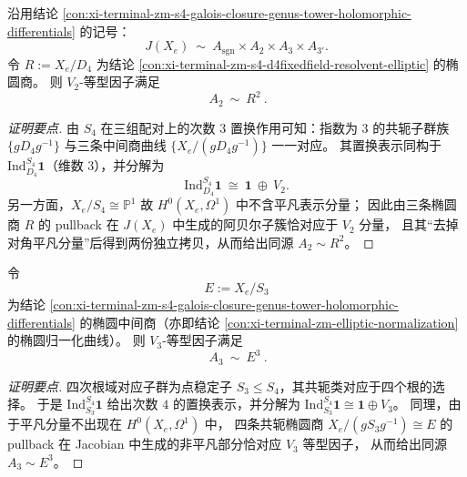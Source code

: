 \begin{conclusion}\label{con:xi-terminal-zm-s4-jacobian-a2-isog-r2}
沿用结论 \ref{con:xi-terminal-zm-s4-galois-closure-genus-tower-holomorphic-differentials} 的记号：
\[
J(X_e)\ \sim\ A_{\mathrm{sgn}}\times A_{2}\times A_{3}\times A_{3'}.
\]
令 \(R:=X_e/D_4\) 为结论 \ref{con:xi-terminal-zm-s4-d4fixedfield-resolvent-elliptic} 的椭圆商。
则 \(V_2\)-等型因子满足
\[
\boxed{\ A_{2}\ \sim\ R^{2}\ }.
\]
\end{conclusion}
\begin{proof}[证明要点]
由 \(S_4\) 在三组配对上的次数 \(3\) 置换作用可知：指数为 \(3\) 的共轭子群族 \(\{gD_4g^{-1}\}\) 与三条中间商曲线 \(\{X_e/(gD_4g^{-1})\}\) 一一对应。
其置换表示同构于 \(\mathrm{Ind}_{D_4}^{S_4}\mathbf{1}\)（维数 \(3\)），并分解为
\[
\mathrm{Ind}_{D_4}^{S_4}\mathbf{1}\ \cong\ \mathbf{1}\ \oplus\ V_2.
\]
另一方面，\(X_e/S_4\cong\mathbb P^1\) 故 \(H^0(X_e,\Omega^1)\) 中不含平凡表示分量；
因此由三条椭圆商 \(R\) 的 pullback 在 \(J(X_e)\) 中生成的阿贝尔子簇恰对应于 \(V_2\) 分量，
且其“去掉对角平凡分量”后得到两份独立拷贝，从而给出同源 \(A_2\sim R^2\)。
\end{proof}

\begin{conclusion}\label{con:xi-terminal-zm-s4-jacobian-a3-isog-e3}
令
\[
E:=X_e/S_3
\]
为结论 \ref{con:xi-terminal-zm-s4-galois-closure-genus-tower-holomorphic-differentials} 的椭圆中间商（亦即结论 \ref{con:xi-terminal-zm-elliptic-normalization} 的椭圆归一化曲线）。
则 \(V_3\)-等型因子满足
\[
\boxed{\ A_{3}\ \sim\ E^{3}\ }.
\]
\end{conclusion}
\begin{proof}[证明要点]
四次根域对应子群为点稳定子 \(S_3\le S_4\)，其共轭类对应于四个根的选择。
于是 \(\mathrm{Ind}_{S_3}^{S_4}\mathbf{1}\) 给出次数 \(4\) 的置换表示，并分解为
\(
\mathrm{Ind}_{S_3}^{S_4}\mathbf{1}\cong \mathbf{1}\oplus V_3
\)。
同理，由于平凡分量不出现在 \(H^0(X_e,\Omega^1)\) 中，
四条共轭椭圆商 \(X_e/(gS_3g^{-1})\cong E\) 的 pullback 在 Jacobian 中生成的非平凡部分恰对应 \(V_3\) 等型因子，
从而给出同源 \(A_3\sim E^3\)。
\end{proof}

